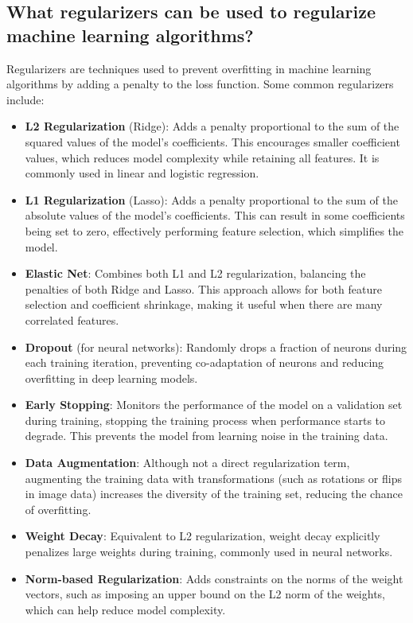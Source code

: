 \subsection{What regularizers can be used to regularize machine learning algorithms?}

Regularizers are techniques used to prevent overfitting in machine learning algorithms by adding a penalty to the loss function. Some common regularizers include:

\begin{itemize}
    \item \textbf{L2 Regularization} (Ridge): Adds a penalty proportional to the sum of the squared values of the model's coefficients. This encourages smaller coefficient values, which reduces model complexity while retaining all features. It is commonly used in linear and logistic regression.
    
    \item \textbf{L1 Regularization} (Lasso): Adds a penalty proportional to the sum of the absolute values of the model's coefficients. This can result in some coefficients being set to zero, effectively performing feature selection, which simplifies the model.
    
    \item \textbf{Elastic Net}: Combines both L1 and L2 regularization, balancing the penalties of both Ridge and Lasso. This approach allows for both feature selection and coefficient shrinkage, making it useful when there are many correlated features.
    
    \item \textbf{Dropout} (for neural networks): Randomly drops a fraction of neurons during each training iteration, preventing co-adaptation of neurons and reducing overfitting in deep learning models.
    
    \item \textbf{Early Stopping}: Monitors the performance of the model on a validation set during training, stopping the training process when performance starts to degrade. This prevents the model from learning noise in the training data.
    
    \item \textbf{Data Augmentation}: Although not a direct regularization term, augmenting the training data with transformations (such as rotations or flips in image data) increases the diversity of the training set, reducing the chance of overfitting.
    
    \item \textbf{Weight Decay}: Equivalent to L2 regularization, weight decay explicitly penalizes large weights during training, commonly used in neural networks.
    
    \item \textbf{Norm-based Regularization}: Adds constraints on the norms of the weight vectors, such as imposing an upper bound on the L2 norm of the weights, which can help reduce model complexity.
\end{itemize}

